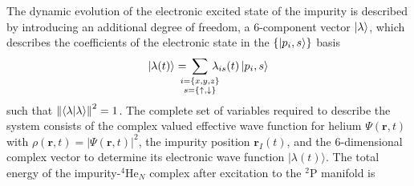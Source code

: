			The dynamic evolution of the electronic excited state of the impurity is described by introducing an additional degree of freedom, a 6-component vector $\ket\lambda$, which describes the coefficients of the electronic state in the $\qty{\ket{p_i,s}}$ basis
			\begin{align}
				\ket{\lambda(t)} = \!\!\!\!\!\sum_{\substack{i=\{x,y,z\}\\s=\{\uparrow,\downarrow\}}}\!\!\!\!\! \lambda_{is}(t) \ket{p_i,s}
			\end{align}
			such that $\norm{\ip{\lambda}}^2=1$. The complete set of variables required to describe the
			system consists of the complex valued effective wave function for helium $\Psi(\mathbf{r}, t)$ with
			$\rho(\mathbf{r}, t) = |\Psi(\mathbf{r}, t)|^2$, the impurity position $\mathbf{r}_I(t)$, and the 6-dimensional complex vector to determine 
			its electronic wave function $|\lambda(t)\rangle$. The total energy of the impurity-$^4$He$_N$ complex after excitation to the $^2$P manifold is

